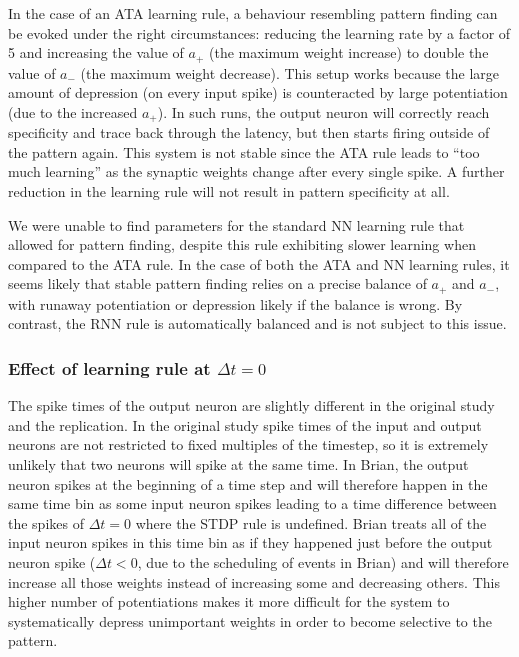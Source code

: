 \documentclass[10pt,a4paper,onecolumn]{article}
\begin{document}
In the case of an ATA learning rule, a behaviour resembling pattern
finding can be evoked under the right circumstances: reducing the
learning rate by a factor of 5 and increasing the value of \(a_{+}\)
(the maximum weight increase) to double the value of \(a_{-}\) (the
maximum weight decrease). This setup works because the large amount of
depression (on every input spike) is counteracted by large potentiation
(due to the increased \(a_{+}\)). In such runs, the output neuron will
correctly reach specificity and trace back through the latency, but then
starts firing outside of the pattern again. This system is not stable
since the ATA rule leads to ``too much learning'' as the synaptic
weights change after every single spike. A further reduction in the
learning rule will not result in pattern specificity at all.

We were unable to find parameters for the standard NN learning rule that
allowed for pattern finding, despite this rule exhibiting slower
learning when compared to the ATA rule. In the case of both the ATA and
NN learning rules, it seems likely that stable pattern finding relies on
a precise balance of \(a_{+}\) and \(a_{-}\), with runaway potentiation
or depression likely if the balance is wrong. By contrast, the RNN rule
is automatically balanced and is not subject to this issue.

\subsubsection{\texorpdfstring{Effect of learning rule at
\(\Delta t=0\)}{Effect of learning rule at \textbackslash{}Delta t=0}}\label{effect-of-learning-rule-at-delta-t0}

The spike times of the output neuron are slightly different in the
original study and the replication. In the original study spike times of
the input and output neurons are not restricted to fixed multiples of
the timestep, so it is extremely unlikely that two neurons will spike at
the same time. In Brian, the output neuron spikes at the beginning of a
time step and will therefore happen in the same time bin as some input
neuron spikes leading to a time difference between the spikes of
\(\Delta t=0\) where the STDP rule is undefined. Brian treats all of the
input neuron spikes in this time bin as if they happened just before the
output neuron spike (\(\Delta t<0\), due to the scheduling of events in
Brian) and will therefore increase all those weights instead of
increasing some and decreasing others. This higher number of
potentiations makes it more difficult for the system to systematically
depress unimportant weights in order to become selective to the pattern.
\end{document}
